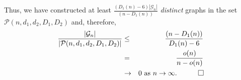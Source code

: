 \documentclass{article}
\newtheorem{Proof of Theorem}{Proof of Theorem}
\begin{document}
Thus, we have constructed at least $\frac{(D_{1}(n)-6)|\mathcal{G}_{n}|}{(n-D_{1}(n))}$ \textit{distinct}
graphs in the set $\mathcal{P}(n,d_{1},d_{2},D_{1},D_{2})$ and, therefore,
\begin{eqnarray*}
\frac{|\mathcal{G}_{n}|}{|\mathcal{P}(n,d_{1},d_{2},D_{1},D_{2})|} & \leq & \frac{(n-D_{1}(n))}{D_{1}(n)-6} \\
& = & \frac{o(n)}{n-o(n)} \\
& \to & 0 \textrm{ as } n \to \infty.
\phantom{qwerty}
\setlength{\unitlength}{.25cm}
\begin{picture}(1,1)
\put(0,0){\line(1,0){1}}
\put(0,0){\line(0,1){1}}
\put(1,1){\line(-1,0){1}}
\put(1,1){\line(0,-1){1}}
\end{picture}
\end{eqnarray*} 
\end{document}
